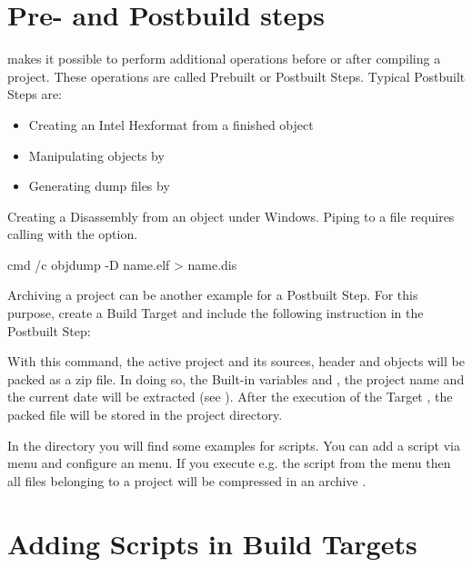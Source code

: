 \section{Pre- and Postbuild steps}\label{sec:pre_postbuild}

\codeblocks makes it possible to perform additional operations before or after compiling a project. These operations are called Prebuilt or Postbuilt Steps. Typical Postbuilt Steps are:

\begin{itemize}
\item Creating an Intel Hexformat from a finished object
\item Manipulating objects by 
\item Generating dump files by 
\end{itemize}


Creating a Disassembly from an object under Windows. Piping to a file requires calling  with the  option.

\begin{cmd}
cmd /c objdump -D name.elf > name.dis
\end{cmd}

Archiving a project can be another example for a Postbuilt Step. For this purpose, create a Build Target  and include the following instruction in the Postbuilt Step:


With this command, the active project and its sources, header and objects will be packed as a zip file. In doing so, the Built-in variables  and , the project name and the current date will be extracted (see ). After the execution of the Target , the packed file will be stored in the project directory.

In the  directory you will find some examples for scripts. You can add a script via menu  and configure an menu. If you execute e.g. the script  from the menu then all files belonging to a project will be compressed in an archive .

\section{Adding Scripts in Build Targets}

